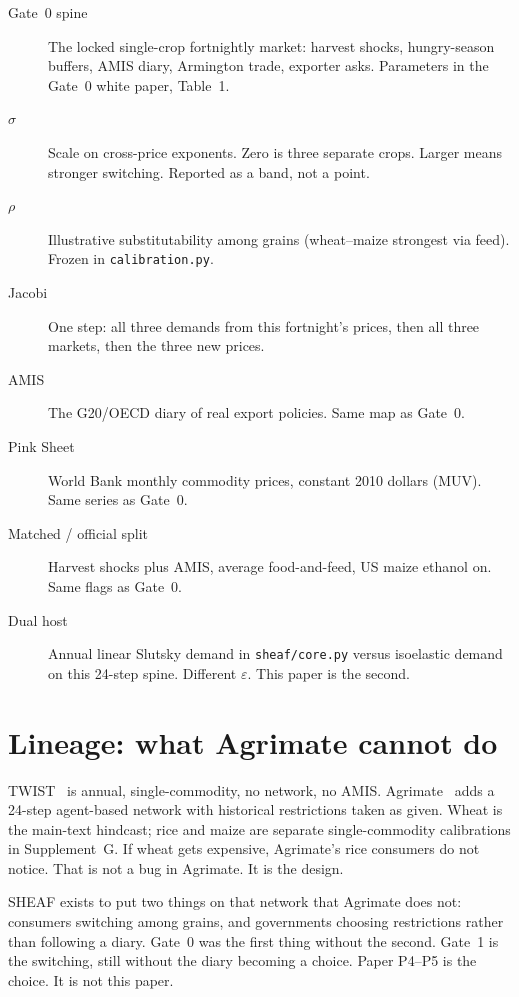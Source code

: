\documentclass[11pt,a4paper]{article}
\begin{document}
\begin{description}
\item[Gate~0 spine] The locked single-crop fortnightly market: harvest
      shocks, hungry-season buffers, AMIS diary, Armington trade, exporter
      asks. Parameters in the Gate~0 white paper, Table~1.
\item[\(\sigma\)] Scale on cross-price exponents. Zero is three separate
      crops. Larger means stronger switching. Reported as a band, not a
      point.
\item[\(\rho\)] Illustrative substitutability among grains (wheat--maize
      strongest via feed). Frozen in \texttt{calibration.py}.
\item[Jacobi] One step: all three demands from this fortnight's prices,
      then all three markets, then the three new prices.
\item[AMIS] The G20/OECD diary of real export policies. Same map as
      Gate~0.
\item[Pink Sheet] World Bank monthly commodity prices, constant 2010
      dollars (MUV). Same series as Gate~0.
\item[Matched / official split] Harvest shocks plus AMIS, average
      food-and-feed, US maize ethanol on. Same flags as Gate~0.
\item[Dual host] Annual linear Slutsky demand in \texttt{sheaf/core.py}
      versus isoelastic demand on this 24-step spine. Different
      \(\varepsilon\). This paper is the second.
\end{description}

\section{Lineage: what Agrimate cannot do}
\label{sec:lineage}

TWIST~\citep{schewe2017} is annual, single-commodity, no network, no AMIS.
Agrimate~\citep{kuhla2025} adds a 24-step agent-based network with
historical restrictions taken as given. Wheat is the main-text hindcast;
rice and maize are separate single-commodity calibrations in
Supplement~G. If wheat gets expensive, Agrimate's rice consumers do not
notice. That is not a bug in Agrimate. It is the design.

SHEAF exists to put two things on that network that Agrimate does not:
consumers switching among grains, and governments choosing restrictions
rather than following a diary. Gate~0 was the first thing without the
second. Gate~1 is the switching, still without the diary becoming a
choice. Paper P4--P5 is the choice. It is not this paper.
\end{document}
